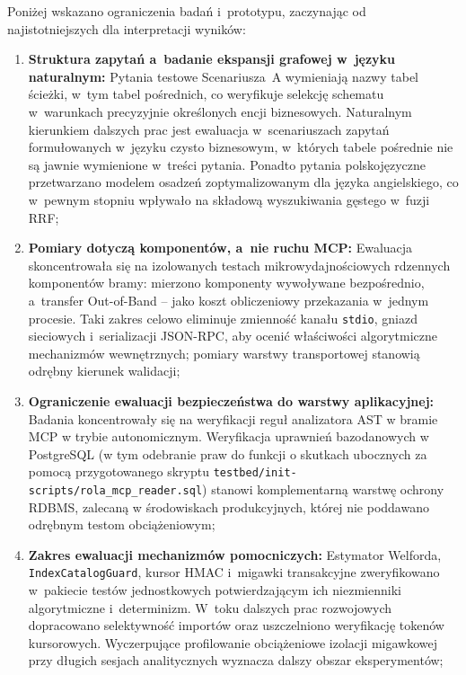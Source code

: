 Poniżej wskazano ograniczenia badań i~prototypu, zaczynając od najistotniejszych dla interpretacji wyników:
\begin{enumerate}
    \item \textbf{Struktura zapytań a~badanie ekspansji grafowej w~języku naturalnym:}
    Pytania testowe Scenariusza~A wymieniają nazwy tabel ścieżki, w~tym tabel pośrednich, co weryfikuje selekcję schematu w~warunkach precyzyjnie określonych encji biznesowych. Naturalnym kierunkiem dalszych prac jest ewaluacja w~scenariuszach zapytań formułowanych w~języku czysto biznesowym, w~których tabele pośrednie nie są jawnie wymienione w~treści pytania. Ponadto pytania polskojęzyczne przetwarzano modelem osadzeń zoptymalizowanym dla języka angielskiego, co w~pewnym stopniu wpływało na składową wyszukiwania gęstego w~fuzji RRF;

    \item \textbf{Pomiary dotyczą komponentów, a~nie ruchu MCP:}
    Ewaluacja skoncentrowała się na izolowanych testach mikrowydajnościowych rdzennych komponentów bramy: mierzono komponenty wywoływane bezpośrednio, a~transfer Out-of-Band -- jako koszt obliczeniowy przekazania w~jednym procesie. Taki zakres celowo eliminuje zmienność kanału \texttt{stdio}, gniazd sieciowych i~serializacji JSON-RPC, aby ocenić właściwości algorytmiczne mechanizmów wewnętrznych; pomiary warstwy transportowej stanowią odrębny kierunek walidacji;

    \item \textbf{Ograniczenie ewaluacji bezpieczeństwa do warstwy aplikacyjnej:}
    Badania koncentrowały się na weryfikacji reguł analizatora AST w bramie MCP w trybie autonomicznym. Weryfikacja uprawnień bazodanowych w PostgreSQL (w tym odebranie praw do funkcji o skutkach ubocznych za pomocą przygotowanego skryptu \texttt{testbed/init-scripts/rola\_mcp\_reader.sql}) stanowi komplementarną warstwę ochrony RDBMS, zalecaną w środowiskach produkcyjnych, której nie poddawano odrębnym testom obciążeniowym;

    \item \textbf{Zakres ewaluacji mechanizmów pomocniczych:}
    Estymator Welforda, \texttt{IndexCatalogGuard}, kursor HMAC i~migawki transakcyjne zweryfikowano w~pakiecie testów jednostkowych potwierdzającym ich niezmienniki algorytmiczne i~determinizm. W~toku dalszych prac rozwojowych dopracowano selektywność importów oraz uszczelniono weryfikację tokenów kursorowych. Wyczerpujące profilowanie obciążeniowe izolacji migawkowej przy długich sesjach analitycznych wyznacza dalszy obszar eksperymentów;


\end{enumerate}
